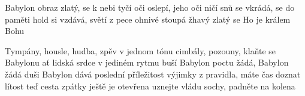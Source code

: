 \begin{TEXT}{Babylon}
\SLOKA {} obraz zlatý,  se k nebi tyčí\NL
{} oči oslepí,  jeho oči ničí \NL
{} snů se vkrádá,  se do paměti\NL
{} hold si vzdává,   světí
\REFREN  {} z pece ohnivé  stoupá žhavý \NL
{} zlatý  se \NL
Ho  je králem \NL
{} Bohu   

\SLOKA Tympány, housle, hudba, zpěv v jednom tónu\NL
cimbály, pozouny, klaňte se Babylonu\NL
ať lidská srdce v jediném rytmu buší\NL
Babylon poctu žádá, Babylon žádá duši
\REFRENHRAJ
\SLOKA Babylon dává poslední příležitost\NL
výjimky z pravidla, máte čas doznat lítost\NL
teď cesta zpátky ještě je otevřena \NL
uznejte vládu sochy, padněte na kolena
\REFRENHRAJ
\end{TEXT}
